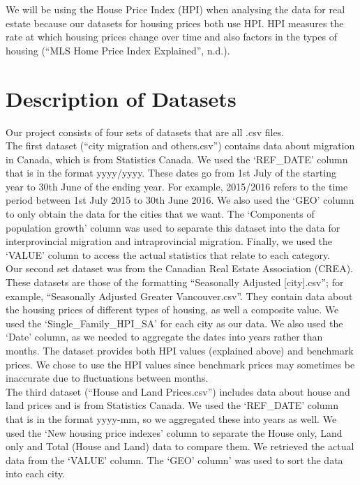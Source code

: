 \documentclass[fontsize=11pt]{article}
\begin{document}
We will be using the House Price Index (HPI) when analysing the data for real estate because our datasets for housing prices both use HPI. HPI measures the rate at which housing prices change over time and also factors in the types of housing (“MLS Home Price Index Explained”, n.d.).

\newpage

\section{Description of Datasets}

Our project consists of four sets of datasets that are all .csv files. \\

The first dataset (“city migration and others.csv”) contains data about migration in Canada, which is from Statistics Canada.  We used the ‘REF\_DATE’ column that is in the format yyyy/yyyy. These dates go from 1st July of the starting year to 30th June of the ending year. For example, 2015/2016 refers to the time period between 1st July 2015 to 30th June 2016. We also used the ‘GEO’ column to only obtain the data for the cities that we want. The ‘Components of population growth’ column was used to separate this dataset into the data for interprovincial migration and intraprovincial migration. Finally, we used the ‘VALUE’ column to access the actual statistics that relate to each category. \\

Our second set dataset was from the Canadian Real Estate Association (CREA). These datasets are those of the formatting “Seasonally Adjusted [city].csv”; for example, “Seasonally Adjusted Greater Vancouver.csv”. They contain data about the housing prices of different types of housing, as well a composite value. We used the ‘Single\_Family\_HPI\_SA’ for each city as our data. We also used the ‘Date’ column, as we needed to aggregate the dates into years rather than months. The dataset provides both HPI values (explained above) and benchmark prices. We chose to use the HPI values since benchmark prices may sometimes be inaccurate due to fluctuations between months. \\

The third dataset (“House and Land Prices.csv”) includes data about house and land prices and is from Statistics Canada. We used the ‘REF\_DATE’ column that is in the format yyyy-mm, so we aggregated these into years as well. We used the ‘New housing price indexes’ column to separate the House only, Land only and Total (House and Land) data to compare them. We retrieved the actual data from the ‘VALUE’ column. The ‘GEO’ column’ was used to sort the data into each city.\\
\end{document}
